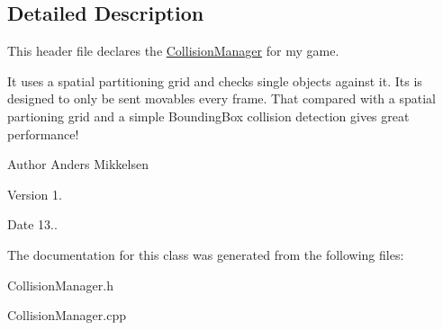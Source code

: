 \subsection{Detailed Description}
This header file declares the \hyperlink{class_collision_manager}{Collision\+Manager} for my game. 

It uses a spatial partitioning grid and checks single objects against it. It\textquotesingle{}s is designed to only be sent movables every frame. That compared with a spatial partioning grid and a simple Bounding\+Box collision detection gives great performance!

\begin{DoxyAuthor}{Author}
Anders Mikkelsen 
\end{DoxyAuthor}
\begin{DoxyVersion}{Version}
1. 
\end{DoxyVersion}
\begin{DoxyDate}{Date}
13.. 
\end{DoxyDate}


The documentation for this class was generated from the following files\+:\begin{DoxyCompactItemize}
\item 
Collision\+Manager.\+h\item 
Collision\+Manager.\+cpp\end{DoxyCompactItemize}
